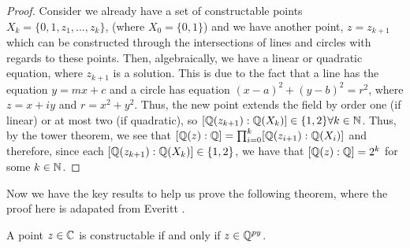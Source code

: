 \begin{proof}  
   Consider we already have a set of constructable points $X_k = \{0,1,z_1,...,z_k\}$, (where $X_0=\{0,1\}$) and we have another point, $z=z_{k+1}$ which can be constructed through the intersections of lines and circles with regards to these points. Then, algebraically, we have a linear or quadratic equation, where $z_{k+1}$ is a solution. This is due to the fact that a line has the equation $y=mx+c$ and a circle has equation $(x-a)^2+(y-b)^2=r^2$, where $z=x+iy$ and $r=x^2+y^2$. Thus, the new point extends the field by order one (if linear) or at most two (if quadratic), so $[\mathbb Q(z_{k+1}):\mathbb Q(X_k)] \in \{1,2\} \forall k \in \mathbb N$. Thus, by the tower theorem, we see that $[\mathbb Q(z):\mathbb Q] = \prod_{i=0}^k [\mathbb Q(z_{i+1}):\mathbb Q(X_i)]$ and therefore, since each $[\mathbb Q(z_{k+1}):\mathbb Q(X_k)] \in \{1,2\}$, we have that $[\mathbb Q(z):\mathbb Q] = 2^k$ for some $k \in \mathbb N$.

\end{proof}


Now we have the key results to help us prove the following theorem, where the proof here is adapated from Everitt \cite{constructions-and-galois}.

\begin{theorem}
    A point $z \in \mathbb C$ is constructable if and only if $z \in \mathbb Q^{py}$.
\end{theorem}

